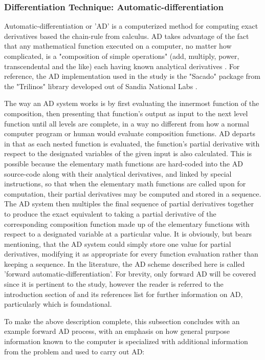 \documentclass[preprint,12pt]{elsarticle}
\begin{document}
\subsubsection{Differentiation Technique: Automatic-differentiation} 
\label{ADsubsection}

Automatic-differentiation or 'AD' is a computerized method for computing exact derivatives based the
chain-rule from calculus. AD takes advantage of the fact that any
mathematical function executed on a computer, no matter how complicated, is a "composition of simple
operations" (add, multiply, power, transcendental and the like) each having known analytical derivatives
\cite{ref-sacado-presentation}. For reference, the AD
implementation used in the study is the "Sacado" package from the "Trilinos" library developed out of Sandia
National Labs \cite{ref-Sacado}.

The way an AD system works is by first evaluating the innermost function of the composition, then presenting
that function's output as input to the next level function until all levels are complete, in a way no
different from how a normal computer program or human would evaluate composition functions.
AD departs in that as each nested function is evaluated, the function's
partial derivative with respect to the designated variables of the given input is also calculated.
This is possible because the elementary math functions are hard-coded into the
AD source-code along with their analytical derivatives, and linked by special instructions, so that when
the elementary math functions are called upon for computation, their partial derivatives may be computed and
stored in a sequence. The AD system then multiples the final sequence of partial derivatives together to
produce the exact equivalent to taking a partial derivative of the corresponding composition
function made up of the elementary functions with respect to a designated variable at a particular
value. It is obviously, but bears mentioning, that the AD system could simply store one value for partial
derivatives, modifying it as appropriate for every function evaluation rather than keeping a sequence.
In the literature, the AD scheme described here is called 'forward automatic-differentiation'. For
brevity, only forward AD will be covered since it is pertinent to the study, however the reader is referred
to the introduction section of \cite{ref-AD-methods} and its references list for further information on AD,
particularly \cite{ref-on-AD} which is foundational. 

To make the above description complete, this subsection concludes with an example forward AD process, with 
an emphasis on how general purpose information known to the computer is specialized with additional
information from the problem and used to carry out AD:
\end{document}
